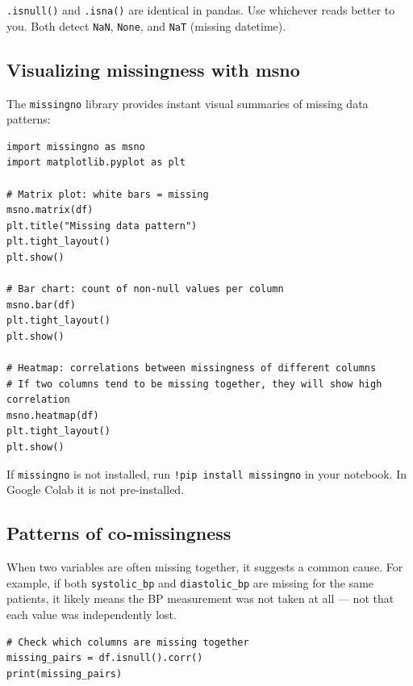 \begin{pythontip}
\texttt{.isnull()} and \texttt{.isna()} are identical in pandas. Use whichever reads better to you. Both detect \texttt{NaN}, \texttt{None}, and \texttt{NaT} (missing datetime).
\end{pythontip}

\subsection{Visualizing missingness with msno}

The \texttt{missingno} library provides instant visual summaries of missing data patterns:

\begin{verbatim}
import missingno as msno
import matplotlib.pyplot as plt

# Matrix plot: white bars = missing
msno.matrix(df)
plt.title("Missing data pattern")
plt.tight_layout()
plt.show()

# Bar chart: count of non-null values per column
msno.bar(df)
plt.tight_layout()
plt.show()

# Heatmap: correlations between missingness of different columns
# If two columns tend to be missing together, they will show high correlation
msno.heatmap(df)
plt.tight_layout()
plt.show()
\end{verbatim}

\begin{warningbox}
If \texttt{missingno} is not installed, run \texttt{!pip install missingno} in your notebook. In Google Colab it is not pre-installed.
\end{warningbox}

\subsection{Patterns of co-missingness}

When two variables are often missing together, it suggests a common cause. For example, if both \texttt{systolic\_bp} and \texttt{diastolic\_bp} are missing for the same patients, it likely means the BP measurement was not taken at all --- not that each value was independently lost.

\begin{verbatim}
# Check which columns are missing together
missing_pairs = df.isnull().corr()
print(missing_pairs)
\end{verbatim}

